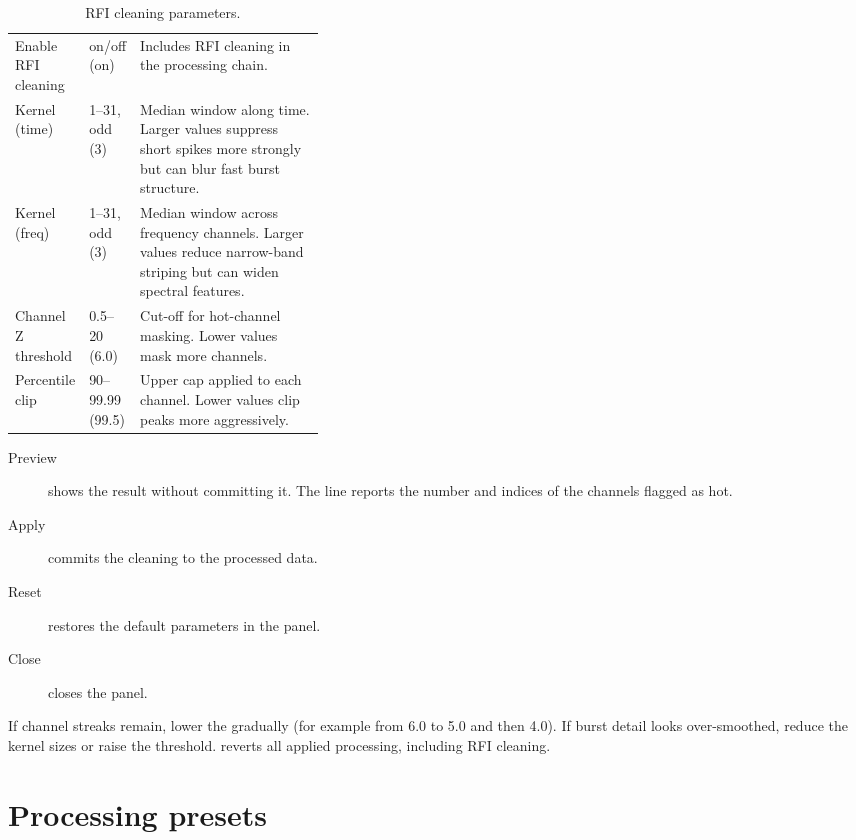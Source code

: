 \begin{table}[!htbp]
  \centering
  \caption{RFI cleaning parameters.}
  \label{tab:rfi}
  \small
  \begin{tabularx}{\linewidth}{@{}P{0.21\linewidth}P{0.15\linewidth}L@{}}
    \toprule
     &  &  \\
    \midrule
    Enable RFI cleaning & on/off (on) & Includes RFI cleaning in the processing chain. \\
    Kernel (time) & 1--31, odd (3) & Median window along time. Larger values suppress short spikes more strongly but can blur fast burst structure. \\
    Kernel (freq) & 1--31, odd (3) & Median window across frequency channels. Larger values reduce narrow-band striping but can widen spectral features. \\
    Channel Z threshold & 0.5--20 (6.0) & Cut-off for hot-channel masking. Lower values mask more channels. \\
    Percentile clip & 90--99.99 (99.5) & Upper cap applied to each channel. Lower values clip peaks more aggressively. \\
    \bottomrule
  \end{tabularx}
\end{table}

\begin{description}
  \item[Preview] shows the result without committing it. The  line
    reports the number and indices of the channels flagged as hot.
  \item[Apply] commits the cleaning to the processed data.
  \item[Reset] restores the default parameters in the panel.
  \item[Close] closes the panel.
\end{description}

If channel streaks remain, lower the  gradually (for example from
6.0 to 5.0 and then 4.0). If burst detail looks over-smoothed, reduce the kernel sizes or
raise the threshold.  reverts all applied processing, including
RFI cleaning.

\section{Processing presets}
\label{sec:presets}

